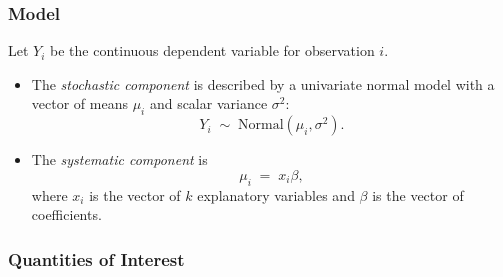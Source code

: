 \documentclass{article}
\begin{document}
\subsubsection{Model}
Let $Y_i$ be the continuous dependent variable for observation $i$.
\begin{itemize}
\item The \emph{stochastic component} is described by a univariate normal
  model with a vector of means $\mu_i$ and scalar variance $\sigma^2$:
  \begin{equation*}
    Y_i \; \sim \; \textrm{Normal}(\mu_i, \sigma^2). 
  \end{equation*}

\item The \emph{systematic component} is 
  \begin{equation*}
    \mu_i \;= \; x_i \beta,
  \end{equation*}
  where $x_i$ is the vector of $k$ explanatory variables and $\beta$ is
  the vector of coefficients.
\end{itemize}


\subsubsection{Quantities of Interest}
\end{document}
